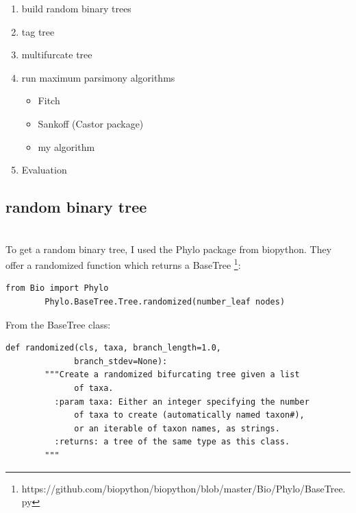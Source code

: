     \begin{enumerate}
      \item build random binary trees
      \item tag tree
      \item multifurcate tree
      \item run maximum parsimony algorithms
      \begin{itemize}
        \item Fitch
        \item Sankoff (Castor package)
        \item my algorithm
      \end{itemize}
      \item Evaluation
    \end{enumerate}

    \subsection{random binary tree}
       \\
      To get a random binary tree, I used the Phylo package from biopython. They offer a randomized
        function which returns a BaseTree \footnote{
          https://github.com/biopython/biopython/blob/master/Bio/Phylo/BaseTree.py
        }:
      \begin{lstlisting}[gobble=6]
        from Bio import Phylo
        Phylo.BaseTree.Tree.randomized(number_leaf nodes)
      \end{lstlisting}
      From the BaseTree class:
      \begin{lstlisting}[gobble=6]
        def randomized(cls, taxa, branch_length=1.0, 
              branch_stdev=None):
        """Create a randomized bifurcating tree given a list
              of taxa.
          :param taxa: Either an integer specifying the number
              of taxa to create (automatically named taxon#), 
              or an iterable of taxon names, as strings.
          :returns: a tree of the same type as this class.
        """
      \end{lstlisting}

